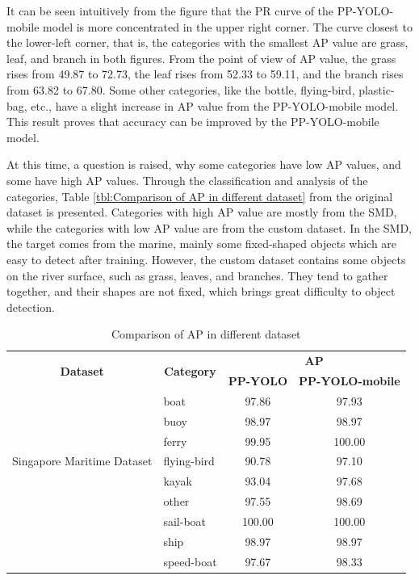 \documentclass[sensors,article,submit,moreauthors,pdftex]{Definitions/mdpi}
\begin{document}
\begin{paracol}{2}
It can be seen intuitively from the figure that the PR curve of the PP-YOLO-mobile model is more concentrated in the upper right corner. 
The curve closest to the lower-left corner, that is, the categories with the smallest AP value are grass, leaf, and branch in both figures.
From the point of view of AP value, the grass rises from 49.87 to 72.73, the leaf rises from 52.33 to 59.11, and the branch rises from 63.82 to 67.80. Some other categories, like the bottle, flying-bird, plastic-bag, etc., have a slight increase in AP value from the PP-YOLO-mobile model. This result proves that accuracy can be improved by the PP-YOLO-mobile model.


At this time, a question is raised, why some categories have low AP values, and some have high AP values. Through the classification and analysis of the categories, Table \ref{tbl:Comparison of AP in different dataset} from the original dataset is presented. Categories with high AP value are mostly from the SMD, while the categories with low AP value are from the custom dataset. In the SMD, the target comes from the marine, mainly some fixed-shaped objects which are easy to detect after training. However, the custom dataset contains some objects on the river surface, such as grass, leaves, and branches. They tend to gather together, and their shapes are not fixed, which brings great difficulty to object detection.

\begin{table}[htbp]
\centering
\caption{Comparison of AP in different dataset}
\begin{tabular}{llcc} 
\toprule

\multicolumn{1}{c}{\multirow{2}{*}{\textbf{Dataset}}} &
\multicolumn{1}{c}{\multirow{2}{*}{\textbf{Category}}} &\multicolumn{2}{c}{\textbf{AP}} \\
\cmidrule(l){3-4} 
&& \textbf{PP-YOLO} & \textbf{PP-YOLO-mobile} \\

\midrule
\multirow{7}{*}{Singapore Maritime Dataset} 
& boat& 97.86  & 97.93  \\
& buoy & 98.97 & 98.97 \\
& ferry & 99.95 & 100.00 \\
& flying-bird & 90.78 & 97.10 \\
& kayak & 93.04 & 97.68 \\
& other & 97.55 & 98.69 \\
& sail-boat & 100.00 & 100.00 \\
& ship & 98.97 & 98.97 \\
& speed-boat & 97.67 & 98.33 \\
\cmidrule(r){1-4}


\end{tabular}
\end{table}
\end{paracol}
\end{document}
